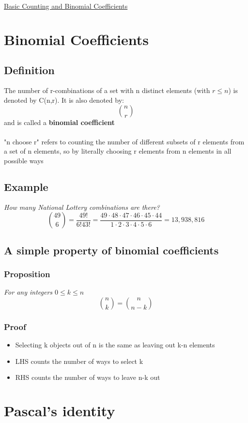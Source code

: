 \documentclass{article}[18pt]
\begin{document}
\begin{center}
\underline{\huge Basic Counting and Binomial Coefficients}
\end{center}
\section{Binomial Coefficients}
\subsection{Definition}
The number of r-combinations of a set with n distinct elements (with $r\leqslant n$) is denoted by C(n,r). It is also denoted by:
$$\binom{n}{r}$$
and is called a \textbf{binomial coefficient}\\
\\
"n choose r" refers to counting the number of different subsets of r elements from a set of n elements, so by literally choosing r elements from n elements in all possible ways
\subsection{Example}
\textit{How many National Lottery combinations are there?}
$$\binom{49}{6}=\dfrac{49!}{6!43!}=\dfrac{49\cdot48\cdot47\cdot46\cdot45\cdot44}{1\cdot2\cdot3\cdot4\cdot5\cdot6}=13,938,816$$
\subsection{A simple property of binomial coefficients}
\subsubsection{Proposition}
\textit{For any integers $0\leqslant k\leqslant n$}
$$\binom{n}{k}=\binom{n}{n-k}$$
\subsubsection{Proof}
\begin{itemize}
\item Selecting k objects out of n is the same as leaving out k-n elements
\item LHS counts the number of ways to select k
\item RHS counts the number of ways to leave n-k out
\end{itemize}
\section{Pascal's identity}
\end{document}
